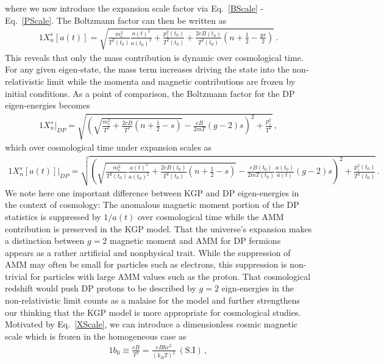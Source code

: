\documentclass[Universe,article,submit,moreauthors,pdftex]{Definitions/mdpi}
\newcommand*{\req}[1]{Eq.~{\eqref{#1}}}
\begin{document}
where we now introduce the expansion scale factor via \req{BScale} - \req{PScale}. The Boltzmann factor can then be written as
\begin{alignat}{1}
    \label{XScale} X_{n}^{s}[a(t)] = \sqrt{\frac{m_{e}^{2}}{T^{2}(t_{0})}\frac{a(t)^{2}}{a(t_{0})^{2}}+\frac{p_{z}^{2}(t_{0})}{T^{2}(t_{0})}+\frac{2eB(t_{0})}{T^{2}(t_{0})}\left(n+\frac{1}{2}-\frac{gs}{2}\right)}\,.
\end{alignat}
This reveals that only the mass contribution is dynamic over cosmological time. For any given eigen-state, the mass term increases driving the state into the non-relativistic limit while the momenta and magnetic contributions are frozen by initial conditions. As a point of comparison, the Boltzmann factor for the DP eigen-energies becomes
\begin{alignat}{1}
    \label{XDP} X_{n}^{s}\vert_{DP} = \sqrt{\left(\sqrt{\frac{m_{e}^{2}}{T^{2}}+\frac{2eB}{T^{2}}\left(n+\frac{1}{2}-s\right)}-\frac{eB}{2mT}(g-2)s\right)^{2}+\frac{p_{z}^{2}}{T^{2}}}\,,
\end{alignat}
which over cosmological time under expansion scales as
\begin{alignat}{1}
    \label{XScaleDP} X_{n}^{s}[a(t)]\vert_{DP} = \sqrt{\left(\sqrt{\frac{m_{e}^{2}}{T^{2}(t_{0})}\frac{a(t)^{2}}{a(t_{0})^{2}}+\frac{2eB(t_{0})}{T^{2}(t_{0})}\left(n+\frac{1}{2}-s\right)}-\frac{eB(t_{0})}{2mT(t_{0})}\frac{a(t_{0})}{a(t)}(g-2)s\right)^{2}+\frac{p_{z}^{2}(t_{0})}{T^{2}(t_{0})}}\,.
\end{alignat}
We note here one important difference between KGP and DP eigen-energies in the context of cosmology: The anomalous magnetic moment portion of the DP statistics is suppressed by $1/a(t)$ over cosmological time while the AMM contribution is preserved in the KGP model. That the universe's expansion makes a distinction between $g=2$ magnetic moment and AMM for DP fermions appears as a rather artificial and nonphysical trait. While the suppression of AMM may often be small for particles such as electrons, this suppression is non-trivial for particles with large AMM values such as the proton. That cosmological redshift would push DP protons to be described by $g=2$ eign-energies in the non-relativistic limit counts as a malaise for the model and further strengthens our thinking that the KGP model is more appropriate for cosmological studies. Motivated by \req{XScale}, we can introduce a dimensionless cosmic magnetic scale which is frozen in the homogeneous case as
\begin{alignat}{1}
    \label{Bo} b_{0}\equiv\frac{eB}{T^{2}}=\frac{eB\hbar c^{2}}{(k_{B}T)^{2}}\ \mathrm{(S.I)}\,,
\end{alignat}
\end{document}
